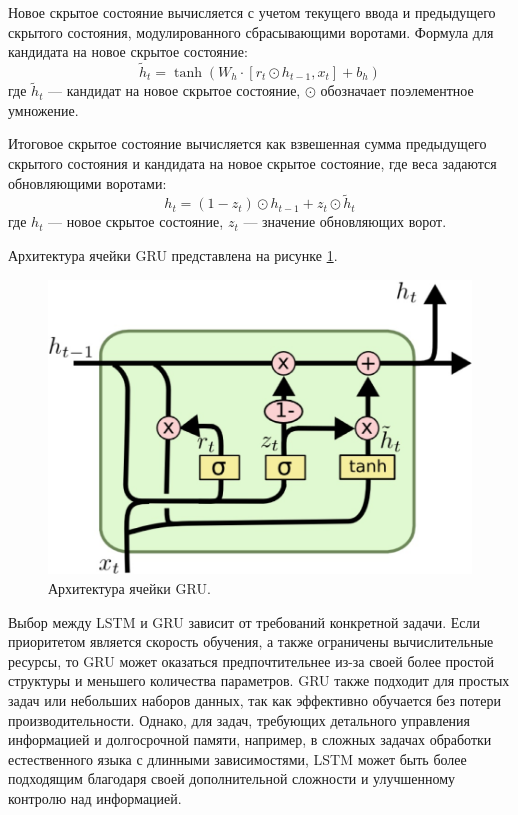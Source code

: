 \documentclass[a4paper,12pt]{extarticle}
\begin{document}
Новое скрытое состояние вычисляется с учетом текущего ввода и предыдущего скрытого состояния, модулированного сбрасывающими воротами. Формула для кандидата на новое скрытое состояние:
\begin{equation}
	\tilde{h}_t = \tanh(W_h \cdot [r_t \odot h_{t-1}, x_t] + b_h)
\end{equation}
где \( \tilde{h}_t \) — кандидат на новое скрытое состояние, \( \odot \) обозначает поэлементное умножение.


Итоговое скрытое состояние вычисляется как взвешенная сумма предыдущего скрытого состояния и кандидата на новое скрытое состояние, где веса задаются обновляющими воротами:
\begin{equation}
	h_t = (1 - z_t) \odot h_{t-1} + z_t \odot \tilde{h}_t
\end{equation}
где \( h_t \) — новое скрытое состояние, \( z_t \) — значение обновляющих ворот.

Архитектура ячейки GRU представлена на рисунке \ref{fig:gru_arch}.

\begin{figure}[ht]
	\centering
	\includegraphics[scale=0.3]{gru-cell.png}
	\caption{Архитектура ячейки GRU.}
	\label{fig:gru_arch}
\end{figure}

Выбор между LSTM и GRU зависит от требований конкретной задачи. Если приоритетом является скорость обучения, а также ограничены вычислительные ресурсы, то GRU может оказаться предпочтительнее из-за своей более простой структуры и меньшего количества параметров. GRU также подходит для простых задач или небольших наборов данных, так как эффективно обучается без потери производительности. Однако, для задач, требующих детального управления информацией и долгосрочной памяти, например, в сложных задачах обработки естественного языка с длинными зависимостями, LSTM может быть более подходящим благодаря своей дополнительной сложности и улучшенному контролю над информацией.
\end{document}
